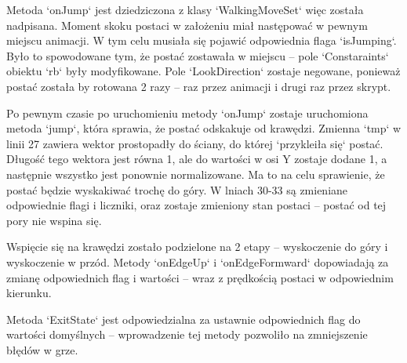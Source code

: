 \documentclass[12pt,twoside]{article}
\begin{document}
Metoda `onJump` jest dziedziczona z klasy `WalkingMoveSet` więc została
nadpisana. Moment skoku postaci w założeniu miał następować w pewnym miejscu
animacji. W tym celu musiała się pojawić odpowiednia flaga `isJumping`. Było to
spowodowane tym, że postać zostawała w miejscu -- pole `Constaraints` obiektu
`rb` były modyfikowane. Pole `LookDirection` zostaje negowane, ponieważ postać
została by rotowana 2 razy -- raz przez animacji i drugi raz przez skrypt. 

Po pewnym czasie po uruchomieniu metody `onJump` zostaje uruchomiona metoda
`jump`, która sprawia, że postać odskakuje od krawędzi. Zmienna `tmp` w linii 27
zawiera wektor prostopadły do ściany, do której `przykleiła się` postać. Długość
tego wektora jest równa 1, ale do wartości w osi Y zostaje dodane 1, a następnie
wszystko jest ponownie normalizowane. Ma to na celu sprawienie, że postać będzie
wyskakiwać trochę do góry. W lniach 30-33 są zmieniane odpowiednie flagi i
liczniki, oraz zostaje zmieniony stan postaci -- postać od tej pory nie wspina
się. 

Wspięcie się na krawędzi zostało podzielone na 2 etapy -- wyskoczenie do góry i
wyskoczenie w przód. Metody `onEdgeUp` i `onEdgeFormward` dopowiadają za zmianę
odpowiednich flag i wartości -- wraz z prędkością postaci w odpowiednim kierunku. 

Metoda `ExitState` jest odpowiedzialna za ustawnie odpowiednich flag do wartości
domyślnych -- wprowadzenie tej metody pozwoliło na zmniejszenie błędów w grze.  
\end{document}
